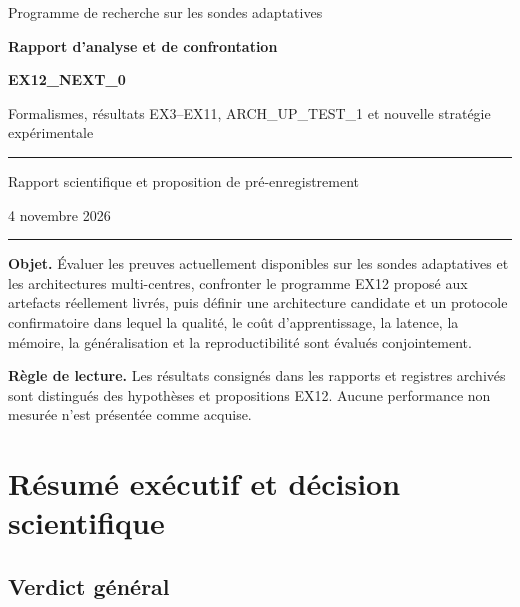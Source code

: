 \documentclass[11pt,a4paper]{article}
\begin{document}
\begin{titlepage}
\centering
\vspace*{1.7cm}
{\Large Programme de recherche sur les sondes adaptatives\par}
\vspace{1.0cm}
{\Huge\bfseries Rapport d'analyse et de confrontation\par}
\vspace{0.25cm}
{\Huge\bfseries EX12\_NEXT\_0\par}
\vspace{0.7cm}
{\Large Formalismes, résultats EX3--EX11, ARCH\_UP\_TEST\_1 et nouvelle stratégie expérimentale\par}
\vspace{1.3cm}
\rule{0.88\textwidth}{0.6pt}
\vspace{0.65cm}
{\large Rapport scientifique et proposition de pré-enregistrement\par}
\vspace{0.4cm}
{\large 4 novembre 2026\par}
\vspace{0.65cm}
\rule{0.88\textwidth}{0.6pt}
\vfill
\begin{minipage}{0.88\textwidth}
\textbf{Objet.} Évaluer les preuves actuellement disponibles sur les sondes adaptatives et les architectures multi-centres, confronter le programme EX12 proposé aux artefacts réellement livrés, puis définir une architecture candidate et un protocole confirmatoire dans lequel la qualité, le coût d'apprentissage, la latence, la mémoire, la généralisation et la reproductibilité sont évalués conjointement.

\textbf{Règle de lecture.} Les résultats consignés dans les rapports et registres archivés sont distingués des hypothèses et propositions EX12. Aucune performance non mesurée n'est présentée comme acquise.
\end{minipage}
\vfill
\end{titlepage}

\tableofcontents
\newpage

\section{Résumé exécutif et décision scientifique}

\subsection{Verdict général}
\end{document}
